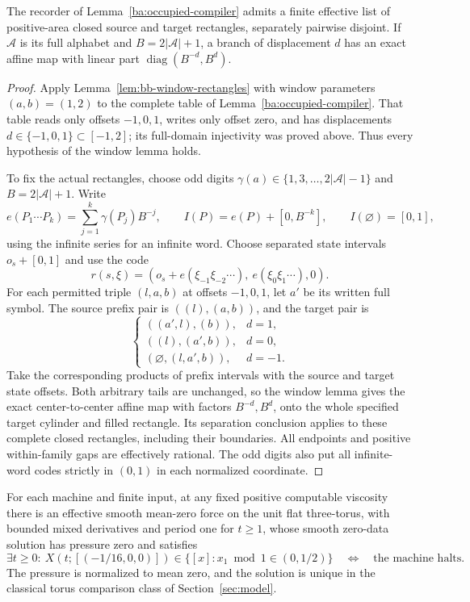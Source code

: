 \begin{lemma}
\label{ba:occupied-cylinders}
The recorder of Lemma~\ref{ba:occupied-compiler} admits a finite
effective list of positive-area closed source and target rectangles,
separately pairwise disjoint.  If $\mathcal A$ is its full alphabet and
$B=2|\mathcal A|+1$, a branch of displacement $d$ has an exact affine
map with linear part $\operatorname{diag}(B^{-d},B^d)$.
\end{lemma}

\begin{proof}\label{ba:occupied-cylinders-proof}
Apply Lemma~\ref{lem:bb-window-rectangles} with window parameters
$(a,b)=(1,2)$ to the complete table of
Lemma~\ref{ba:occupied-compiler}.  That table reads only offsets
$-1,0,1$, writes only offset zero, and has displacements
$d\in\{-1,0,1\}\subset[-1,2]$; its full-domain injectivity was
proved above.  Thus every hypothesis of the window lemma holds.

To fix the actual rectangles, choose odd digits
$\gamma(a)\in\{1,3,\ldots,2|\mathcal A|-1\}$ and
$B=2|\mathcal A|+1$.  Write
\[
 e(P_1\cdots P_k)=\sum_{j=1}^k\gamma(P_j)B^{-j},\qquad
 I(P)=e(P)+[0,B^{-k}],\qquad I(\varnothing)=[0,1],
\]
using the infinite series for an infinite word.  Choose separated
state intervals $o_s+[0,1]$ and use the code
\[
 r(s,\xi)=
 (o_s+e(\xi_{-1}\xi_{-2}\cdots),\ e(\xi_0\xi_1\cdots),0).
\]
For each permitted triple $(l,a,b)$ at offsets $-1,0,1$, let $a'$
be its written full symbol.  The source prefix pair is $((l),(a,b))$,
and the target pair is
\[
 \begin{cases}
 ((a',l),(b)),&d=1,\\
 ((l),(a',b)),&d=0,\\
 (\varnothing,(l,a',b)),&d=-1.
 \end{cases}
\]
Take the corresponding products of prefix intervals with the source
and target state offsets.  Both arbitrary tails are unchanged, so the
window lemma gives the exact center-to-center affine map with factors
$B^{-d},B^d$, onto the whole specified target cylinder and filled
rectangle.  Its separation conclusion applies to these complete closed
rectangles, including their boundaries.  All endpoints and positive
within-family gaps are effectively rational.  The odd digits also put
all infinite-word codes strictly in $(0,1)$ in each normalized coordinate.
\end{proof}

\begin{theorem}
\label{ba:occupied-torus}
For each machine and finite input, at any fixed positive computable
viscosity there is an effective smooth mean-zero force on the unit flat
three-torus, with bounded mixed derivatives and period one for $t\ge1$,
whose smooth zero-data solution has pressure zero and satisfies
\[
 \exists t\ge0:\ X(t;[(-1/16,0,0)])\in
 \{[x]:x_1\bmod1\in(0,1/2)\}
 \quad\Longleftrightarrow\quad\text{the machine halts}.
\]
The pressure is normalized to mean zero, and the solution is unique in
the classical torus comparison class of Section~\ref{sec:model}.
\end{theorem}

